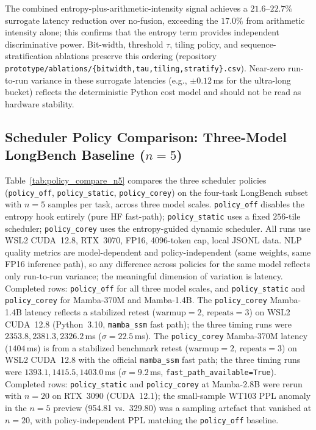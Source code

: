 The combined entropy-plus-arithmetic-intensity signal achieves a $21.6$--$22.7\%$ surrogate latency reduction over no-fusion, exceeding the $17.0\%$ from arithmetic intensity alone; this confirms that the entropy term provides independent discriminative power. Bit-width, threshold $\tau$, tiling policy, and sequence-stratification ablations preserve this ordering (repository \texttt{prototype/ablations/\{bitwidth,tau,tiling,stratify\}.csv}). Near-zero run-to-run variance in these surrogate latencies (e.g., $\pm 0.12$\,ms for the ultra-long bucket) reflects the deterministic Python cost model and should not be read as hardware stability.


\subsection{Scheduler Policy Comparison: Three-Model LongBench Baseline ($n{=}5$)}
\label{sec:policy_comparison_n5}
Table~\ref{tab:policy_compare_n5} compares the three scheduler policies (\texttt{policy\_off}, \texttt{policy\_static}, \texttt{policy\_corey}) on the four-task LongBench subset with $n{=}5$ samples per task, across three model scales.
\texttt{policy\_off} disables the entropy hook entirely (pure HF fast-path); \texttt{policy\_static} uses a fixed $256$-tile scheduler; \texttt{policy\_corey} uses the entropy-guided dynamic scheduler.
All runs use WSL2 CUDA~12.8, RTX~3070, FP16, 4096-token cap, local JSONL data.
NLP quality metrics are model-dependent and policy-independent (same weights, same FP16 inference path), so any difference across policies for the same model reflects only run-to-run variance; the meaningful dimension of variation is latency.
Completed rows: \texttt{policy\_off} for all three model scales, and \texttt{policy\_static} and \texttt{policy\_corey} for Mamba-370M and Mamba-1.4B.
The \texttt{policy\_corey} Mamba-1.4B latency reflects a stabilized retest ($\text{warmup}{=}2$, $\text{repeats}{=}3$) on WSL2 CUDA~12.8 (Python~3.10, \texttt{mamba\_ssm} fast path); the three timing runs were $2353.8, 2381.3, 2326.2$\,ms ($\sigma{=}22.5$\,ms).
The \texttt{policy\_corey} Mamba-370M latency ($1404$\,ms) is from a stabilized benchmark retest ($\text{warmup}{=}2$, $\text{repeats}{=}3$) on WSL2 CUDA~12.8 with the official \texttt{mamba\_ssm} fast path; the three timing runs were $1393.1, 1415.5, 1403.0$\,ms ($\sigma{=}9.2$\,ms, \texttt{fast\_path\_available=True}).
Completed rows: \texttt{policy\_static} and \texttt{policy\_corey} at Mamba-2.8B were rerun with $n{=}20$ on RTX~3090 (CUDA~12.1); the small-sample WT103 PPL anomaly in the $n{=}5$ preview (954.81 vs.\ 329.80) was a sampling artefact that vanished at $n{=}20$, with policy-independent PPL matching the \texttt{policy\_off} baseline.

